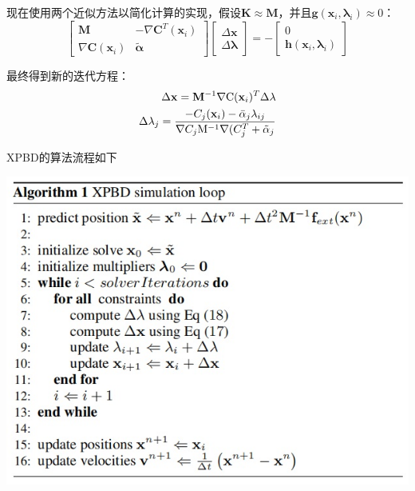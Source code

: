 \documentclass{CLGPY}
\begin{document}
\begin{multicols}{2}
		现在使用两个近似方法以简化计算的实现，假设$\mathbf{K} \approx \mathbf{M}$，并且$\mathbf{g}\left(\mathbf{x}_{i}, \boldsymbol{\lambda}_{i}\right) \approx 0$：
		\begin{equation}
		\left[\begin{array}{cc}
		\mathbf{M} & -\nabla \mathbf{C}^{T}\left(\mathbf{x}_{i}\right) \\
		\nabla \mathbf{C}\left(\mathbf{x}_{i}\right) & \tilde{\boldsymbol{\alpha}}
		\end{array}\right]\left[\begin{array}{l}
		\Delta \mathbf{x} \\
		\Delta \boldsymbol{\lambda}
		\end{array}\right]=-\left[\begin{array}{l}
		0 \\
		\mathbf{h}\left(\mathbf{x}_{i}, \boldsymbol{\lambda}_{i}\right)
		\end{array}\right]
		\end{equation}


		最终得到新的迭代方程：
       \begin{equation}
		\begin{split}
			\Delta{\bf x}={\bf M}^{-1}\nabla\mathrm{C}({\bf x}_{i})^{T}\Delta\lambda \\
			\Delta\lambda_{j}=\frac{-C_{j}({\bf x}_{i})-\bar{\alpha}_{j}\lambda_{i j}}{\nabla C_{j}\mathrm{M}^{-1}\nabla(C_{j}^{T}+\tilde{\alpha}_{j}}
		\end{split}
		\end{equation}

		XPBD的算法流程如下
        \begin{center}
            \includegraphics[width=1.0\linewidth]{./fig/XPBD算法.jpg}
        \end{center}


\end{multicols}
\end{document}
